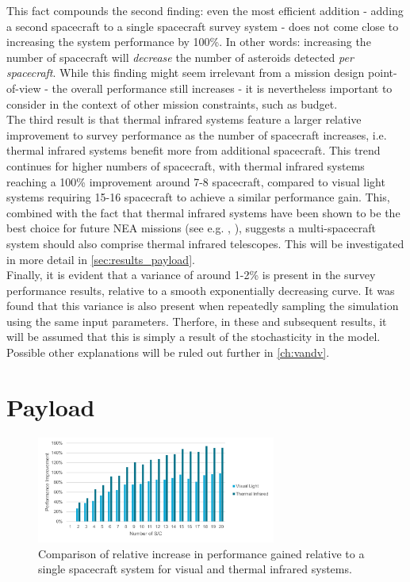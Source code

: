 This fact compounds the second finding: even the most efficient addition - adding a second spacecraft to a single spacecraft survey system - does not come close to increasing the system performance by 100\%. In other words: increasing the number of spacecraft will \textit{decrease} the number of asteroids detected \textit{per spacecraft}. While this finding might seem irrelevant from a mission design point-of-view - the overall performance still increases - it is nevertheless important to consider in the context of other mission constraints, such as budget. \\

The third result is that thermal infrared systems feature a larger relative improvement to survey performance as the number of spacecraft increases, i.e. thermal infrared systems benefit more from additional spacecraft. This trend continues for higher numbers of spacecraft, with thermal infrared systems reaching a 100\% improvement around 7-8 spacecraft, compared to visual light systems requiring 15-16 spacecraft to achieve a similar performance gain. This, combined with the fact that thermal infrared systems have been shown to be the best choice for future NEA missions (see e.g. \cite{2017NEOSDT}, \cite{ThesisOlga}), suggests a multi-spacecraft system should also comprise thermal infrared telescopes. This will be investigated in more detail in \autoref{sec:results_payload}.\\

Finally, it is evident that a variance of around 1-2\% is present in the survey performance results, relative to a smooth exponentially decreasing curve. It was found that this variance is also present when repeatedly sampling the simulation using the same input parameters. Therfore, in these and subsequent results, it will be assumed that this is simply a result of the stochasticity in the model. Possible other explanations will be ruled out further in \autoref{ch:vandv}.

\section{Payload}
\label{sec:results_payload}
\begin{figure}[htbp]
 \centering
 \includegraphics[width=0.7\textwidth]{img/tir_vs_vis_many.pdf}
 \caption{Comparison of relative increase in performance gained relative to a single spacecraft system for visual and thermal infrared systems.}
 \label{fig:tir_vs_vis_many}
\end{figure}

